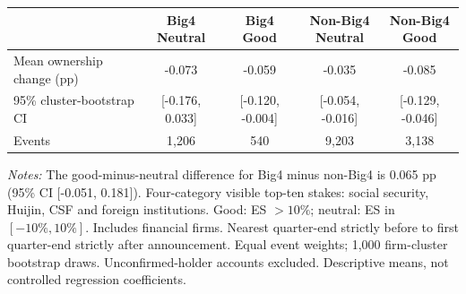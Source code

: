 \documentclass[10pt]{article}
\begin{document}
\begin{minipage}{20.5cm}\fontsize{10.5}{13}\selectfont\centering
\setlength{\tabcolsep}{4pt}\renewcommand{\arraystretch}{1.12}
\begin{tabular*}{\textwidth}{@{\extracolsep{\fill}}lcccc@{}}\toprule
 & \shortstack{Big4\\Neutral} & \shortstack{Big4\\Good} & \shortstack{Non-Big4\\Neutral} & \shortstack{Non-Big4\\Good} \\
\midrule
Mean ownership change (pp) & -0.073 & -0.059 & -0.035 & -0.085 \\
95\% cluster-bootstrap CI & [-0.176, 0.033] & [-0.120, -0.004] & [-0.054, -0.016] & [-0.129, -0.046] \\
Events & 1,206 & 540 & 9,203 & 3,138 \\
\bottomrule\end{tabular*}
\par\medskip\raggedright\fontsize{9}{11}\selectfont
\textit{Notes:} The good-minus-neutral difference for Big4 minus non-Big4 is 0.065 pp (95\% CI [-0.051, 0.181]). Four-category visible top-ten stakes: social security, Huijin, CSF and foreign institutions. Good: ES $>10\%$; neutral: ES in $[-10\%,10\%]$. Includes financial firms. Nearest quarter-end strictly before to first quarter-end strictly after announcement. Equal event weights; 1,000 firm-cluster bootstrap draws. Unconfirmed-holder accounts excluded. Descriptive means, not controlled regression coefficients.
\end{minipage}
\end{document}
